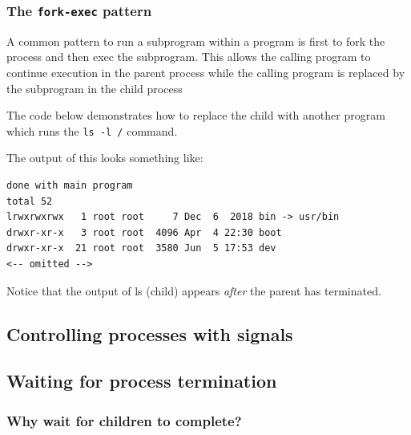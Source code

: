 \documentclass[a4paper]{article}
\begin{document}
\subsubsection{The \texttt{fork-exec} pattern}

A common pattern to run a subprogram within a program is first to fork the process
and then exec the subprogram. This allows the calling program to continue execution
in the parent process while the calling program is replaced by the subprogram in the child process

The code below demonstrates how to replace the child with another program which runs the \texttt{ls -l /} command.





The output of this looks something like:
\begin{verbatim}
done with main program
total 52
lrwxrwxrwx   1 root root     7 Dec  6  2018 bin -> usr/bin
drwxr-xr-x   3 root root  4096 Apr  4 22:30 boot
drwxr-xr-x  21 root root  3580 Jun  5 17:53 dev
<-- omitted -->
\end{verbatim}
Notice that the output of ls (child) appears \textit{after} the parent has terminated.




\subsection{Controlling processes with signals}

\TODO




\subsection{Waiting for process termination}


\subsubsection{Why wait for children to complete?}
\end{document}
